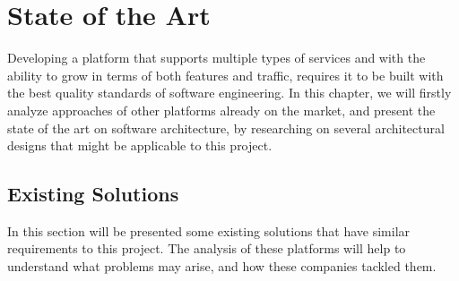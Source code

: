 \chapter{State of the Art} %
\label{chap:StateOfTheArt}
Developing a platform that supports multiple types of services and with the ability to grow in terms of both features and traffic, requires it to be built with the best quality standards of software engineering. In this chapter, we will firstly analyze approaches of other platforms already on the market, and present the state of the art on software architecture, by researching on several architectural designs that might be applicable to this project.

\section{Existing Solutions}
In this section will be presented some existing solutions that have similar requirements to this project. The analysis of these platforms will help to understand what problems may arise, and how these companies tackled them.

